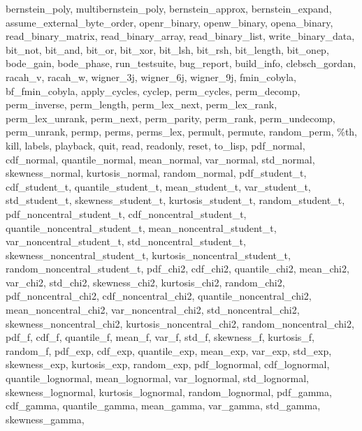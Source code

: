 {{    bernstein_poly,
    multibernstein_poly,
    bernstein_approx,
    bernstein_expand,
    assume_external_byte_order,
    openr_binary,
    openw_binary,
    opena_binary,
    read_binary_matrix,
    read_binary_array,
    read_binary_list,
    write_binary_data,
    bit_not,
    bit_and,
    bit_or,
    bit_xor,
    bit_lsh,
    bit_rsh,
    bit_length,
    bit_onep,
    bode_gain,
    bode_phase,
    run_testsuite,
    bug_report,
    build_info,
    clebsch_gordan,
    racah_v,
    racah_w,
    wigner_3j,
    wigner_6j,
    wigner_9j,
    fmin_cobyla,
    bf_fmin_cobyla,
    apply_cycles,
    cyclep,
    perm_cycles,
    perm_decomp,
    perm_inverse,
    perm_length,
    perm_lex_next,
    perm_lex_rank,
    perm_lex_unrank,
    perm_next,
    perm_parity,
    perm_rank,
    perm_undecomp,
    perm_unrank,
    permp,
    perms,
    perms_lex,
    permult,
    permute,
    random_perm,
    \%th,
    kill,
    labels,
    playback,
    quit,
    read,
    readonly,
    reset,
    to_lisp,
    pdf_normal,
    cdf_normal,
    quantile_normal,
    mean_normal,
    var_normal,
    std_normal,
    skewness_normal,
    kurtosis_normal,
    random_normal,
    pdf_student_t,
    cdf_student_t,
    quantile_student_t,
    mean_student_t,
    var_student_t,
    std_student_t,
    skewness_student_t,
    kurtosis_student_t,
    random_student_t,
    pdf_noncentral_student_t,
    cdf_noncentral_student_t,
    quantile_noncentral_student_t,
    mean_noncentral_student_t,
    var_noncentral_student_t,
    std_noncentral_student_t,
    skewness_noncentral_student_t,
    kurtosis_noncentral_student_t,
    random_noncentral_student_t,
    pdf_chi2,
    cdf_chi2,
    quantile_chi2,
    mean_chi2,
    var_chi2,
    std_chi2,
    skewness_chi2,
    kurtosis_chi2,
    random_chi2,
    pdf_noncentral_chi2,
    cdf_noncentral_chi2,
    quantile_noncentral_chi2,
    mean_noncentral_chi2,
    var_noncentral_chi2,
    std_noncentral_chi2,
    skewness_noncentral_chi2,
    kurtosis_noncentral_chi2,
    random_noncentral_chi2,
    pdf_f,
    cdf_f,
    quantile_f,
    mean_f,
    var_f,
    std_f,
    skewness_f,
    kurtosis_f,
    random_f,
    pdf_exp,
    cdf_exp,
    quantile_exp,
    mean_exp,
    var_exp,
    std_exp,
    skewness_exp,
    kurtosis_exp,
    random_exp,
    pdf_lognormal,
    cdf_lognormal,
    quantile_lognormal,
    mean_lognormal,
    var_lognormal,
    std_lognormal,
    skewness_lognormal,
    kurtosis_lognormal,
    random_lognormal,
    pdf_gamma,
    cdf_gamma,
    quantile_gamma,
    mean_gamma,
    var_gamma,
    std_gamma,
    skewness_gamma,
}}

